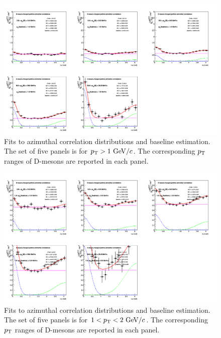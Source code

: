 \begin{figure}[h]
\centering
\includegraphics[width=0.99\linewidth, height=0.70\linewidth,angle=270]{figures/Fits/cFitting_0_pthad1dot0to99dot.png}
\caption{Fits to azimuthal correlation distributions and baseline estimation. The set of five panels is for $p_{\rm T}>1~\mathrm{GeV}/c$. The corresponding $p_{\rm T}$ ranges of D-mesons are reported in each panel.}
\label{fig:StdFit3}
\end{figure}
\begin{figure}[h]
\centering
\includegraphics[width=0.99\linewidth, height=0.70\linewidth,angle=270]{figures/Fits/cFitting_0_pthad1dot0to2dot0.png}
\caption{Fits to azimuthal correlation distributions and baseline estimation. The set of five panels is for $1<p_{\rm T}<2~\mathrm{GeV}/c$. The corresponding $p_{\rm T}$ ranges of D-mesons are reported in each panel.}
\label{fig:StdFit4}
\end{figure}
